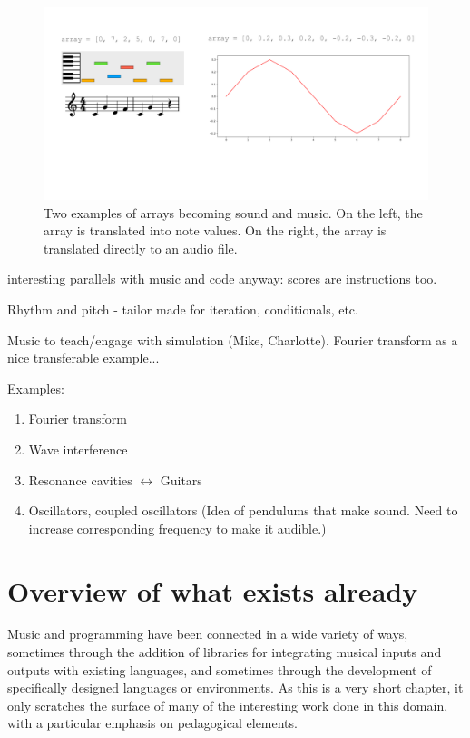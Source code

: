 \begin{figure}
    \centering
    \includegraphics[width=1\linewidth]{images/fig1_arrays_as_sound_and_music.pdf}
    \caption{Two examples of arrays becoming sound and music. On the left, the array is translated into note values. On the right, the array is translated directly to an audio file.}
    \label{fig:arrays-as-music}
\end{figure}

interesting parallels with music and code anyway: scores are instructions too.

Rhythm and pitch - tailor made for iteration, conditionals, etc.

Music to teach/engage with simulation (Mike, Charlotte). Fourier transform as a nice transferable example...

Examples:
\begin{enumerate}
    \item Fourier transform
    \item Wave interference
    \item Resonance cavities $\leftrightarrow{}$ Guitars
    \item Oscillators, coupled oscillators (Idea of pendulums that make sound. Need to increase corresponding frequency to make it audible.)
\end{enumerate}


\section{Overview of what exists already} \label{sec:literature}

Music and programming have been connected in a wide variety of ways, sometimes through the addition of libraries for integrating musical inputs and outputs with existing languages, and sometimes through the development of specifically designed languages or environments. As this is a very short chapter, it only scratches the surface of many of the interesting work done in this domain, with a particular emphasis on pedagogical elements.

